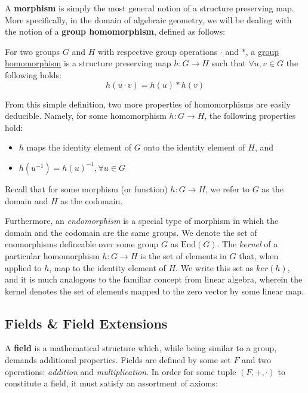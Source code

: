A \textbf{morphism} is simply the most general notion of a structure preserving map. More specifically, in the domain of algebraic geometry, we will be dealing with the notion of a \textbf{group homomorphism}, defined as follows:
\begin{tcolorbox}
\begin{definition}
\label{defn:homomorphism}
For two groups $G$ and $H$ with respective group operations $\cdot$ and $*$, a \underline{group homomorphism} is a structure preserving map $h: G \rightarrow H$ such that $\forall u, v \in G$ the following holds:
$$h(u \cdot v) = h(u) * h(v)$$
\end{definition}
\end{tcolorbox}

From this simple definition, two more properties of homomorphisms are easily deducible. Namely, for some homomorphism $h: G \rightarrow H$, the following properties hold:
\begin{itemize}
\item $h$ maps the identity element of $G$ onto the identity element of $H$, and
\item $h(u^{-1}) = h(u)^{-1}, \forall u \in G$
\end{itemize}
Recall that for some morphism (or function) $h: G \rightarrow H$, we refer to $G$ as the domain and $H$ as the codomain.

Furthermore, an \emph{endomorphism} is a special type of morphism in which the domain and the codomain are the same groups. We denote the set of enomorphisms defineable over some group $G$ as $\text{End}(G)$.
The \emph{kernel} of a particular homomorphism $h: G \rightarrow H$  is the set of elements in $G$ that, when applied to $h$, map to the identity element of $H$. We write this set as $ker(h)$, and it is much analogous to the familiar concept from linear algebra, wherein the kernel denotes the set of elements mapped to the zero vector by some linear map.
\vspace{10mm}

\subsection{Fields \& Field Extensions}
\label{subsec:fields}

A \textbf{field} is a mathematical structure which, while being similar to a group, demands additional properties. Fields are defined by some set $F$ and two operations: \emph{addition} and \emph{multiplication}. In order for some tuple $(F,+,\cdot)$ to constitute a field, it must satisfy an assortment of axioms:\\

